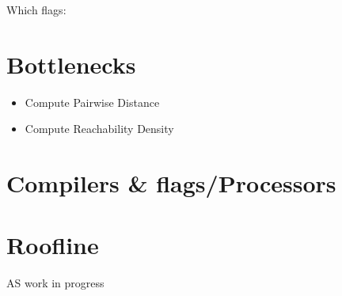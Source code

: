 \documentclass[12pt,a4paper,oneside]{article}
\begin{document}
	Which flags: 

	
	\section*{Bottlenecks}
	
	\begin{itemize}
		\item Compute Pairwise Distance
		\item Compute Reachability Density
	\end{itemize}
	
	\section*{Compilers \& flags/Processors}
	
	\section*{Roofline}
	AS work in progress
	
\end{document}
